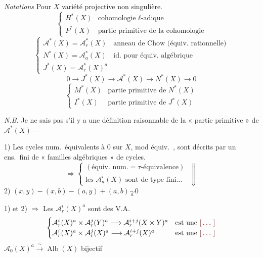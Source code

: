 \documentclass[11pt,a4paper]{article}
\begin{document}
\emph{Notations} \quad Pour $X$ variété projective non singulière.
\[
\begin{cases}
H^{*}(X) & \text{cohomologie } \ell\text{-adique} \\
P^{*}(X) & \text{partie primitive de la cohomologie}
\end{cases}
\]
\[
\begin{cases}
\mathcal{A}^{*}(X) = \mathcal{A}^{*}_{r}(X) & \text{anneau de Chow (équiv.\ rationnelle)} \\
N^{*}(X) = \mathcal{A}^{*}_{a}(X) & \text{id.\ pour équiv.\ algébrique} \\
J^{*}(X) = \mathcal{A}^{*}_{r}(X)^{a}
\end{cases}
\]
\[
0 \longrightarrow J^{*}(X) \longrightarrow \mathcal{A}^{*}(X) \longrightarrow
N^{*}(X) \longrightarrow 0
\]
\[
\begin{cases}
M^{*}(X) & \text{partie primitive de } N^{*}(X) \\
I^{*}(X) & \text{partie primitive de } J^{*}(X)
\end{cases}
\]

\emph{N.B.} Je ne sais pas s'il y a une définition raisonnable de la
« partie primitive » de $\mathcal{A}^{*}(X)$ ---

1) Les cycles num.\ équivalents à $0$ sur $X$, mod équiv.\
, sont décrits par un ens.\ fini de « familles
algébriques » de cycles.
\[
\Longrightarrow
\begin{cases}
(\text{équiv.\ num.} = \tau\text{-équivalence}) \\
\text{les } \mathcal{A}^{i}_{a}(X) \text{ sont de type fini} \ldots
\end{cases}
\ \Downarrow
\]
2) \quad $(x, y) - (x, b) - (a, y) + (a, b) \underset{a}{\sim} 0$

1) et 2) $\Longrightarrow$ Les $\mathcal{A}^{i}_{r}(X)^{a}$ sont des V.A.
\[
\begin{cases}
\mathcal{A}^{i}_{r}(X)^{a} \times \mathcal{A}^{j}_{r}(Y)^{a} \longrightarrow
\mathcal{A}^{i+j}_{r}(X \times Y)^{a} & \text{est une \ill{}} \\
\mathcal{A}^{i}_{r}(X)^{a} \times \mathcal{A}^{j}_{r}(X)^{a} \longrightarrow
\mathcal{A}^{i+j}_{r}(X)^{a} & \text{est une \ill{}}
\end{cases}
\]
\struck{\ill{}} \quad $\mathcal{A}_{0}(X)^{a} \xrightarrow{\ \sim\ }
\operatorname{Alb}(X)$ \quad bijectif
\end{document}
